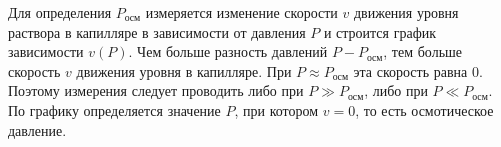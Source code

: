 Для определения $P_{осм}$ измеряется изменение скорости $v$ движения уровня раствора в капилляре в зависимости от давления $P$ и строится график зависимости $v(P)$. Чем больше разность давлений $P - P_{осм}$, тем больше скорость $v$ движения уровня в капилляре. При $P \approx P_{осм}$ эта скорость равна 0. Поэтому измерения следует проводить либо при $P \gg P_{осм}$, либо при $P \ll P_{осм}$. По графику определяется значение $P$, при котором $v = 0$, то есть осмотическое давление.
